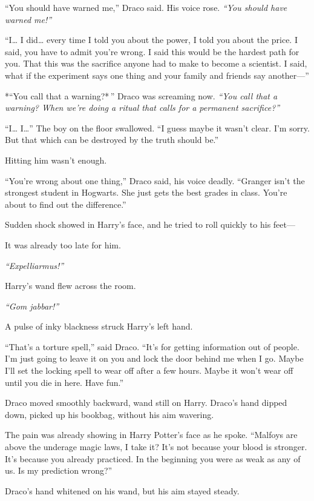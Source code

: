 ``You should have warned me,'' Draco said. His voice rose. \emph{``You
should have warned me!''}

``I\ldots{} I did\ldots{} every time I told you about the power, I told
you about the price. I said, you have to admit you're wrong. I said this
would be the hardest path for you. That this was the sacrifice anyone
had to make to become a scientist. I said, what if the experiment says
one thing and your family and friends say another---''

*``You call that a warning?* '' Draco was screaming now. \emph{``You
call that a warning? When we're doing a ritual that calls for a
permanent sacrifice?''}

``I\ldots{} I\ldots{}'' The boy on the floor swallowed. ``I guess maybe
it wasn't clear. I'm sorry. But that which can be destroyed by the truth
should be.''

Hitting him wasn't enough.

``You're wrong about one thing,'' Draco said, his voice deadly.
``Granger isn't the strongest student in Hogwarts. She just gets the
best grades in class. You're about to find out the difference.''

Sudden shock showed in Harry's face, and he tried to roll quickly to his
feet---

It was already too late for him.

\emph{``Expelliarmus!''}

Harry's wand flew across the room.

\emph{``Gom jabbar!''}

A pulse of inky blackness struck Harry's left hand.

``That's a torture spell,'' said Draco. ``It's for getting information
out of people. I'm just going to leave it on you and lock the door
behind me when I go. Maybe I'll set the locking spell to wear off after
a few hours. Maybe it won't wear off until you die in here. Have fun.''

Draco moved smoothly backward, wand still on Harry. Draco's hand dipped
down, picked up his bookbag, without his aim wavering.

The pain was already showing in Harry Potter's face as he spoke.
``Malfoys are above the underage magic laws, I take it? It's not because
your blood is stronger. It's because you already practiced. In the
beginning you were as weak as any of us. Is my prediction wrong?''

Draco's hand whitened on his wand, but his aim stayed steady.


